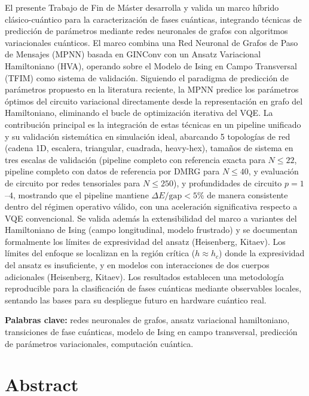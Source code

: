 \documentclass[11pt,a4paper,spanish]{book}
\begin{document}
El presente Trabajo de Fin de Máster desarrolla y valida un marco híbrido clásico-cuántico para la caracterización de fases cuánticas, integrando técnicas de predicción de parámetros mediante redes neuronales de grafos con algoritmos variacionales cuánticos. El marco combina una Red Neuronal de Grafos de Paso de Mensajes (MPNN) basada en GINConv con un Ansatz Variacional Hamiltoniano (HVA), operando sobre el Modelo de Ising en Campo Transversal (TFIM) como sistema de validación. Siguiendo el paradigma de predicción de parámetros propuesto en la literatura reciente, la MPNN predice los parámetros óptimos del circuito variacional directamente desde la representación en grafo del Hamiltoniano, eliminando el bucle de optimización iterativa del VQE. La contribución principal es la integración de estas técnicas en un pipeline unificado y su validación sistemática en simulación ideal, abarcando 5 topologías de red (cadena 1D, escalera, triangular, cuadrada, heavy-hex), tamaños de sistema en tres escalas de validación (pipeline completo con referencia exacta para $N \leq 22$, pipeline completo con datos de referencia por DMRG para $N \leq 40$, y evaluación de circuito por redes tensoriales para $N \leq 250$), y profundidades de circuito $p = 1$--$4$, mostrando que el pipeline mantiene $\Delta E/\text{gap} < 5\%$ de manera consistente dentro del régimen operativo válido, con una aceleración significativa respecto a VQE convencional. Se valida además la extensibilidad del marco a variantes del Hamiltoniano de Ising (campo longitudinal, modelo frustrado) y se documentan formalmente los límites de expresividad del ansatz (Heisenberg, Kitaev). Los límites del enfoque se localizan en la región crítica ($h \approx h_c$) donde la expresividad del ansatz es insuficiente, y en modelos con interacciones de dos cuerpos adicionales (Heisenberg, Kitaev). Los resultados establecen una metodología reproducible para la clasificación de fases cuánticas mediante observables locales, sentando las bases para su despliegue futuro en hardware cuántico real.

\vspace{0.5cm}
{\bf Palabras clave:} redes neuronales de grafos, ansatz variacional hamiltoniano, transiciones de fase cuánticas, modelo de Ising en campo transversal, predicción de parámetros variacionales, computación cuántica.

\chapter{Abstract}
\end{document}

